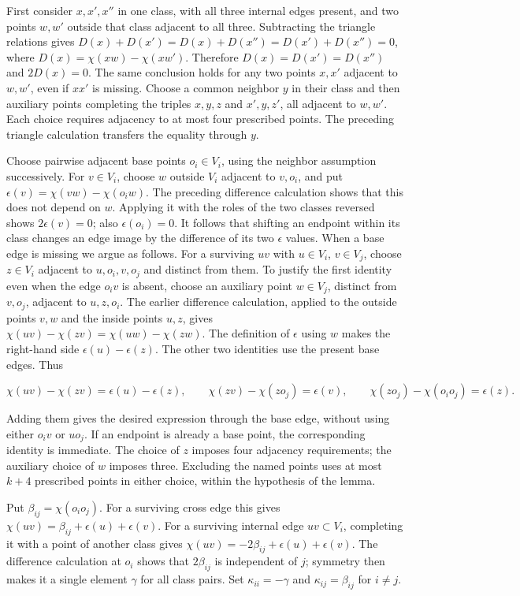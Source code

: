 \documentclass[english,11pt,a4paper]{article}
\begin{document}
First consider \(x,x',x''\) in one class, with all three internal edges present, and two points \(w,w'\) outside that class adjacent to all three. Subtracting the triangle relations gives \(D(x)+D(x')=D(x)+D(x'')=D(x')+D(x'')=0\), where \(D(x)=\chi(xw)-\chi(xw')\). Therefore \(D(x)=D(x')=D(x'')\) and \(2D(x)=0\). The same conclusion holds for any two points \(x,x'\) adjacent to \(w,w'\), even if \(xx'\) is missing. Choose a common neighbor \(y\) in their class and then auxiliary points completing the triples \(x,y,z\) and \(x',y,z'\), all adjacent to \(w,w'\). Each choice requires adjacency to at most four prescribed points. The preceding triangle calculation transfers the equality through \(y\).

Choose pairwise adjacent base points \(o_i\in V_i\), using the neighbor assumption successively. For \(v\in V_i\), choose \(w\) outside \(V_i\) adjacent to \(v,o_i\), and put \(\epsilon(v)=\chi(vw)-\chi(o_iw)\). The preceding difference calculation shows that this does not depend on \(w\). Applying it with the roles of the two classes reversed shows \(2\epsilon(v)=0\); also \(\epsilon(o_i)=0\). It follows that shifting an endpoint within its class changes an edge image by the difference of its two \(\epsilon\) values. When a base edge is missing we argue as follows. For a surviving \(uv\) with \(u\in V_i\), \(v\in V_j\), choose \(z\in V_i\) adjacent to \(u,o_i,v,o_j\) and distinct from them. To justify the first identity even when the edge \(o_iv\) is absent, choose an auxiliary point \(w\in V_j\), distinct from \(v,o_j\), adjacent to \(u,z,o_i\). The earlier difference calculation, applied to the outside points \(v,w\) and the inside points \(u,z\), gives \(\chi(uv)-\chi(zv)=\chi(uw)-\chi(zw)\). The definition of \(\epsilon\) using \(w\) makes the right-hand side \(\epsilon(u)-\epsilon(z)\). The other two identities use the present base edges. Thus

\[\chi(uv)-\chi(zv)=\epsilon(u)-\epsilon(z),\qquad
\chi(zv)-\chi(zo_j)=\epsilon(v),\qquad
\chi(zo_j)-\chi(o_io_j)=\epsilon(z).\]

Adding them gives the desired expression through the base edge, without using either \(o_iv\) or \(uo_j\). If an endpoint is already a base point, the corresponding identity is immediate. The choice of \(z\) imposes four adjacency requirements; the auxiliary choice of \(w\) imposes three. Excluding the named points uses at most \(k+4\) prescribed points in either choice, within the hypothesis of the lemma.

Put \(\beta_{ij}=\chi(o_io_j)\). For a surviving cross edge this gives \(\chi(uv)=\beta_{ij}+\epsilon(u)+\epsilon(v)\). For a surviving internal edge \(uv\subset V_i\), completing it with a point of another class gives \(\chi(uv)=-2\beta_{ij}+\epsilon(u)+\epsilon(v)\). The difference calculation at \(o_i\) shows that \(2\beta_{ij}\) is independent of \(j\); symmetry then makes it a single element \(\gamma\) for all class pairs. Set \(\kappa_{ii}=-\gamma\) and \(\kappa_{ij}=\beta_{ij}\) for \(i\ne j\).
\end{document}
